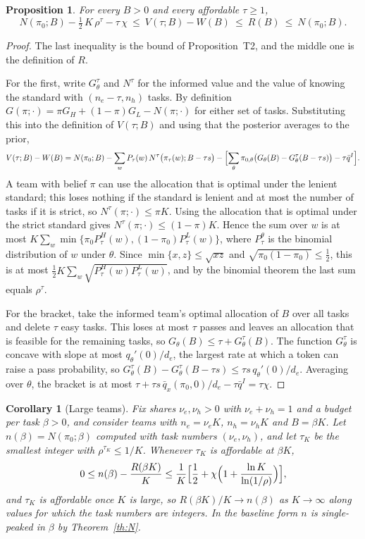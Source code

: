\documentclass[11pt]{article}
\newtheorem{proposition}{Proposition}
\newtheorem{corollary}{Corollary}
\theoremstyle{definition}
\begin{document}
\begin{proposition}\label{prop:sandwich}
For every $B>0$ and every affordable $\tau\ge1$,
\[
N(\pi_0;B)-\tfrac12\,K\,\rho^{\tau}-\tau\,\chi\ \le\ V(\tau;B)-W(B)\ \le\ R(B)\ \le\ N(\pi_0;B).
\]
\end{proposition}

\begin{proof}
The last inequality is the bound of Proposition~T2, and the middle one is the definition of $R$.

For the first, write $G_\theta^\tau$ and $N^\tau$ for the informed value and the value of knowing the standard with $(n_e-\tau,n_h)$ tasks. By definition $G(\pi;\cdot)=\pi G_H+(1-\pi)G_L-N(\pi;\cdot)$ for either set of tasks. Substituting this into the definition of $V(\tau;B)$ and using that the posterior averages to the prior,
\[
V(\tau;B)-W(B)=N(\pi_0;B)-\sum_wP_\tau(w)\,N^\tau\bigl(\pi_\tau(w);B-\tau s\bigr)-\Bigl[\sum_\theta\pi_{0,\theta}\bigl(G_\theta(B)-G_\theta^\tau(B-\tau s)\bigr)-\tau\bar q^I\Bigr].
\]
A team with belief $\pi$ can use the allocation that is optimal under the lenient standard; this loses nothing if the standard is lenient and at most the number of tasks if it is strict, so $N^\tau(\pi;\cdot)\le\pi K$. Using the allocation that is optimal under the strict standard gives $N^\tau(\pi;\cdot)\le(1-\pi)K$. Hence the sum over $w$ is at most $K\sum_w\min\{\pi_0P_\tau^H(w),(1-\pi_0)P_\tau^L(w)\}$, where $P_\tau^\theta$ is the binomial distribution of $w$ under $\theta$. Since $\min\{x,z\}\le\sqrt{xz}$ and $\sqrt{\pi_0(1-\pi_0)}\le\frac12$, this is at most $\frac12K\sum_w\sqrt{P_\tau^H(w)P_\tau^L(w)}$, and by the binomial theorem the last sum equals $\rho^\tau$.

For the bracket, take the informed team's optimal allocation of $B$ over all tasks and delete $\tau$ easy tasks. This loses at most $\tau$ passes and leaves an allocation that is feasible for the remaining tasks, so $G_\theta(B)\le\tau+G_\theta^\tau(B)$. The function $G_\theta^\tau$ is concave with slope at most $q_\theta'(0)/d_e$, the largest rate at which a token can raise a pass probability, so $G_\theta^\tau(B)-G_\theta^\tau(B-\tau s)\le\tau s\,q_\theta'(0)/d_e$. Averaging over $\theta$, the bracket is at most $\tau+\tau s\,\bar q_x(\pi_0,0)/d_e-\tau\bar q^I=\tau\chi$.
\end{proof}

\begin{corollary}[Large teams]\label{cor:large}
Fix shares $\nu_e,\nu_h>0$ with $\nu_e+\nu_h=1$ and a budget per task $\beta>0$, and consider teams with $n_e=\nu_eK$, $n_h=\nu_hK$ and $B=\beta K$. Let $n(\beta)=N(\pi_0;\beta)$ computed with task numbers $(\nu_e,\nu_h)$, and let $\tau_K$ be the smallest integer with $\rho^{\tau_K}\le1/K$. Whenever $\tau_K$ is affordable at $\beta K$,
\[
0\le n(\beta)-\frac{R(\beta K)}{K}\le\frac{1}{K}\Bigl[\frac12+\chi\Bigl(1+\frac{\ln K}{\ln(1/\rho)}\Bigr)\Bigr],
\]
and $\tau_K$ is affordable once $K$ is large, so $R(\beta K)/K\to n(\beta)$ as $K\to\infty$ along values for which the task numbers are integers. In the baseline form $n$ is single-peaked in $\beta$ by Theorem~\ref{th:N}.
\end{corollary}
\end{document}
